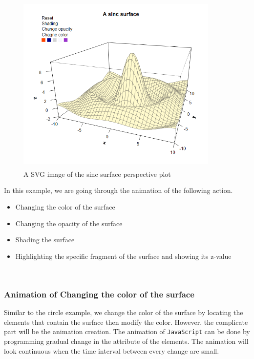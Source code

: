 \documentclass{report}
\begin{document}
\begin{figure}[h]
	\begin{center}
		\includegraphics[height = 9cm, width = 10cm]{figure/svg/origin_1.PNG}
		\caption{A SVG image of the sinc surface perspective plot}
		\label{Example_6.3.01}
	\end{center}
\end{figure}




In this example, we are going through the animation of the following action. 

\begin{itemize}
	\item Changing the color of the surface
	\item Changing the opacity of the surface
	\item Shading the surface
	\item Highlighting the specific fragment of the surface and showing its z-value  
\end{itemize}
\\

\subsubsection*{Animation of Changing the color of the surface}
Similar to the circle example, we change the color of the surface by locating the elements that contain the surface then modify the color. However, the complicate part will be the animation creation. The animation of \texttt{JavaScript} can be done by programming gradual change in the attribute of the elements. The animation will look continuous when the time interval between every change are small.\\
\end{document}
